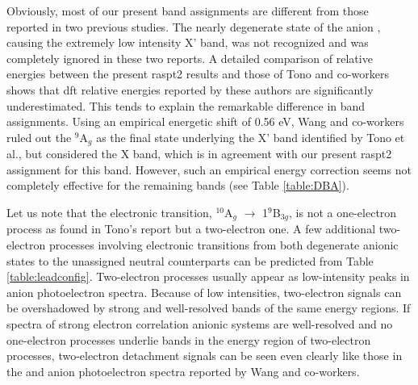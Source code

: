 \begin{refsection}

Obviously, most of our present band assignments are different from those reported in two previous studies. \cite{Tono2003B, Zhai06} The nearly degenerate state of the anion , causing the extremely low intensity X' band, was not recognized and was completely ignored in these two reports. A detailed comparison of relative energies between the present \acrshort{raspt2} results and those of Tono and co-workers shows that \acrshort{dft} relative energies reported by these authors are significantly underestimated. This tends to explain the remarkable difference in band assignments. Using an empirical energetic shift of 0.56 eV, Wang and co-workers ruled out the $^9$A$_g$ as the final state underlying the X' band identified by Tono et al., but considered the X band, which is in agreement with our present \acrshort{raspt2} assignment for this band. However, such an empirical energy correction seems not completely effective for the remaining bands (see Table \ref{table:DBA}). 



Let us note that the electronic transition, $^{10}$A$_g$ $\longrightarrow$ 1$^9$B$_{3g}$, is not a one-electron process as found in Tono’s report but a two-electron one. A few additional two-electron processes involving electronic transitions from both degenerate anionic states to the unassigned neutral counterparts can be predicted from Table \ref{table:leadconfig}. Two-electron processes usually appear as low-intensity peaks in anion photoelectron spectra. \cite{ScO, UO2,TiO} Because of low intensities, two-electron signals can be overshadowed by strong and well-resolved bands of the same energy regions. If spectra of strong electron correlation anionic systems are well-resolved and no one-electron processes underlie bands in the energy region of two-electron processes, two-electron detachment signals can be seen even clearly like those in the  and  anion photoelectron spectra reported by Wang and co-workers. \cite{UO2, CuO}      



\end{refsection}
